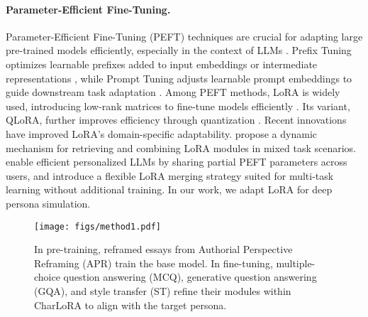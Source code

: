 \paragraph{Parameter-Efficient Fine-Tuning.}
Parameter-Efficient Fine-Tuning (PEFT) techniques are crucial for adapting large pre-trained models efficiently, especially in the context of LLMs \cite{xu2023parameter, ding2023parameter, chen2024flexible}. Prefix Tuning optimizes learnable prefixes added to input embeddings or intermediate representations \cite{li2021prefix}, while Prompt Tuning adjusts learnable prompt embeddings to guide downstream task adaptation \cite{lester2021power}. Among PEFT methods, LoRA is widely used, introducing low-rank matrices to fine-tune models efficiently \cite{hulora}. Its variant, QLoRA, further improves efficiency through quantization \cite{dettmers2024qlora}.
Recent innovations have improved LoRA’s domain-specific adaptability. \citet{zhao2024loraretriever} propose a dynamic mechanism for retrieving and combining LoRA modules in mixed task scenarios. \citet{tan2024personalized} enable efficient personalized LLMs by sharing partial PEFT parameters across users, and \citet{zhao2024merging} introduce a flexible LoRA merging strategy suited for multi-task learning without additional training. In our work, we adapt LoRA for deep persona simulation.

\begin{figure*}[t]
    \centering
    \texttt{[image: figs/method1.pdf]}
    \caption{In pre-training, reframed essays from Authorial Perspective Reframing (APR) train the base model. In fine-tuning, multiple-choice question answering (MCQ), generative question answering (GQA), and style transfer (ST) refine their modules within CharLoRA to align with the target persona.}
    \label{fig:method}
\end{figure*}